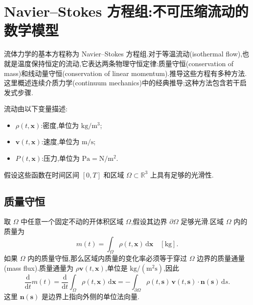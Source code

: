 \chapter{Navier--Stokes 方程组:不可压缩流动的数学模型}\label{chap:navier-stokes}\label{chap:flow-equations}

\begin{note}[基本原理和变量]\label{note:basic-principles}
流体力学的基本方程称为 Navier--Stokes 方程组.对于等温流动(isothermal flow),也就是温度保持恒定的流动,它表达两条物理守恒定律:质量守恒(conservation of mass)和线动量守恒(conservation of linear momentum).推导这些方程有多种方法.这里概述连续介质力学(continuum mechanics)中的经典推导;这种方法包含若干启发式步骤.

流动由以下变量描述:
\begin{itemize}
  \item $\rho(t,\bm{x})$:密度,单位为 $\mathrm{kg}/\mathrm{m}^3$;
  \item $\bm{v}(t,\bm{x})$:速度,单位为 $\mathrm{m}/\mathrm{s}$;
  \item $P(t,\bm{x})$:压力,单位为 $\mathrm{Pa}=\mathrm{N}/\mathrm{m}^2$.
\end{itemize}
假设这些函数在时间区间 $[0,T]$ 和区域 $\Omega\subset\mathbb{R}^3$ 上具有足够的光滑性.
\end{note}

\section{质量守恒}\label{sec:mass-conservation}

\begin{note}[一般守恒律]\label{note:general-conservation-law}
取 $\Omega$ 中任意一个固定不动的开体积区域 $\Omega$,假设其边界 $\partial\Omega$ 足够光滑.区域 $\Omega$ 内的质量为
\begin{equation*}
  m(t)=\int_{\Omega}\rho(t,\bm{x})\,\mathrm{d}\bm{x}\quad[\mathrm{kg}].
\end{equation*}
如果 $\Omega$ 内的质量守恒,那么区域内质量的变化率必须等于穿过 $\Omega$ 边界的质量通量(mass flux).质量通量为 $\rho\bm{v}(t,\bm{x})$,单位是 $\mathrm{kg}/(\mathrm{m}^2\mathrm{s})$,因此
\begin{equation}\label{eq:mass-balance-integral}
  \frac{\mathrm{d}}{\mathrm{d}t}m(t)
  =\frac{\mathrm{d}}{\mathrm{d}t}\int_{\Omega}\rho(t,\bm{x})\,\mathrm{d}\bm{x}
  =-\int_{\partial\Omega}\rho(t,\bm{s})\,\bm{v}(t,\bm{s})\cdot\bm{n}(\bm{s})\,\mathrm{d}s.
\end{equation}
这里 $\bm{n}(\bm{s})$ 是边界上指向外侧的单位法向量.
\end{note}

